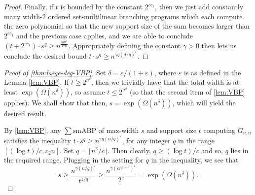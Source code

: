 \documentclass[10pt,a4paper]{article}
\theoremstyle{definition}%
\theoremstyle{plain}
\newcommand{\sbp}{\sum\mathrm{smABP}}
\newcommand{\eps}{\varepsilon}
\begin{document}
\begin{proof}
Finally, if $t$ is bounded by the constant $2^{cc_1}$, then we just add constantly many width-$2$ ordered set-multilinear branching programs which each compute the zero polynomial so that the new support size of the sum becomes larger than $2^{cc_1}$ and the previous case applies, and we are able to conclude $(t + 2^{cc_1})\cdot s^q \geq n^{{\frac{\alpha qr^\eps }{128}}}$. Appropriately defining the constant $\gamma>0$ then lets  us conclude the desired bound $t\cdot s^q \geq n^{{{\gamma q(d/q)^\eps}}}$.
\end{proof}

\begin{proof}[Proof of \autoref{thm:large-deg-VBP}]
Set $\delta = \eps/(1+\eps)$, where $\eps$ is as defined in the Lemma \ref{lem:VBP}. If $t \geq 2^{n^{\delta}}$, then we trivially have that the total-width is at least  ${\exp(\Omega(n^{\delta}))}$, so assume $t \leq 2^{n^{\delta}}$ (so that the second item of \autoref{lem:VBP} applies). We shall show that then, $s = \exp(\Omega(n^{\delta}))$, which will yield the desired result.

By \autoref{lem:VBP}, any $\sbp$ of max-width $s$ and support size $t$ computing $G_{n,n}$ satisfies the inequality $t\cdot s^q \geq n^{{\gamma q(n/q)^\eps}}$, for any integer $q$ in the range $ [(\log t)/c, c_2n]$. Set $q = \lceil n^{\delta}/c\rceil$. Then clearly, $q\geq (\log t)/c$ and so, $q$ lies in the required range.  Plugging in the setting for $q$ in the inequality, we see that 
\[
s \geq \frac{n^{\gamma{({n/q})^\eps}}}{t^{1/q}} \geq \frac{n^{\gamma({cn^{1-\delta}})^{\eps}}}{2^c} = \exp(\Omega(n^{\delta})).
\]
\end{proof}
\end{document}
